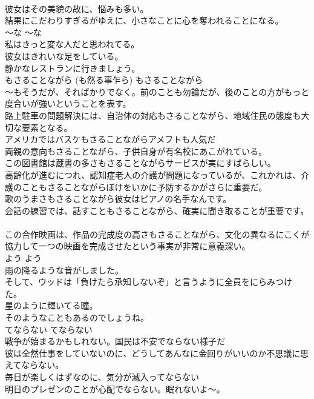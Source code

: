 \documentclass[8pt]{extreport}
\begin{document}
\begin{CJK}{UTF8}{min}
\\	彼女はその美貌の故に、悩みも多い。  
\\	結果にこだわりすぎるがゆえに、小さなことに心を奪われることになる。  
\\	〜な	〜な	
\\	私はきっと変な人だと思われてる。  
\\	彼女はきれいな足をしている。  
\\	静かなレストランに行きましょう。  
\\	もさることながら (も然る事乍ら)	もさることながら	
\\	〜もそうだが、そればかりでなく。前のことも勿論だが、後のことの方がもっと度合いが強いということを表す。	
\\	路上駐車の問題解決には、自治体の対応もさることながら、地域住民の態度も大切な要素となる。  
\\	アメリカではバスケもさることながらアメフトも人気だ  
\\	両親の意向もさることながら、子供自身が有名校にあこがれている。  
\\	この図書館は蔵書の多さもさることながらサービスが実にすばらしい。   
\\	高齢化が進むにつれ、認知症老人の介護が問題になっているが、これかれは、介護のこともさることながらぼけをいかに予防するかがさらに重要だ。  
\\	歌のうまさもさることながら彼女はピアノの名手なんです。   
\\	会話の練習では、話すこともさることながら、確実に聞き取ることが重要です。   
\\	この合作映画は、作品の完成度の高さもさることながら、文化の異なるにこくが協力して一つの映画を完成させたという事実が非常に意義深い。   
\\	よう	よう	
\\	雨の降るような音がしました。  
\\	そして、ウッドは「負けたら承知しないぞ」と言うように全員をにらみつけた。  
\\	星のように輝いてる瞳。  
\\	そのようなこともあるのでしょうね。  
\\	てならない	てならない	
\\	戦争が始まるかもしれない。国民は不安でならない様子だ  
\\	彼は全然仕事をしていないのに、どうしてあんなに金回りがいいのか不思議に思えてならない。  
\\	毎日が楽しくはずなのに、気分が滅入ってならない  
\\	明日のプレゼンのことが心配でならない。眠れないよ〜。   

\end{CJK}
\end{document}
